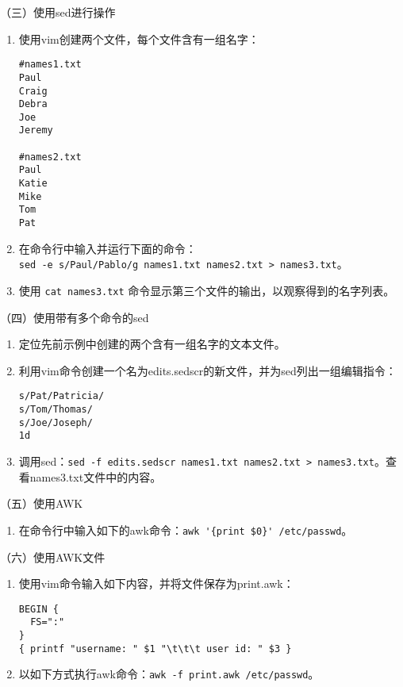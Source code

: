 \vspace{0.1in}
（三）使用sed进行操作
\begin{enumerate}
  \item 使用vim创建两个文件，每个文件含有一组名字：
\begin{verbatim}
#names1.txt
Paul
Craig
Debra
Joe
Jeremy

#names2.txt
Paul
Katie
Mike
Tom
Pat
\end{verbatim}
  \item 在命令行中输入并运行下面的命令：\\ \verb|sed -e s/Paul/Pablo/g names1.txt names2.txt > names3.txt|。
  \item 使用 \verb|cat names3.txt| 命令显示第三个文件的输出，以观察得到的名字列表。
\end{enumerate}

\vspace{0.1in}
（四）使用带有多个命令的sed
\begin{enumerate}
  \item 定位先前示例中创建的两个含有一组名字的文本文件。
  \item 利用vim命令创建一个名为edits.sedscr的新文件，并为sed列出一组编辑指令：
\begin{verbatim}
s/Pat/Patricia/
s/Tom/Thomas/
s/Joe/Joseph/
1d
\end{verbatim}
  \item 调用sed：\verb|sed -f edits.sedscr names1.txt names2.txt > names3.txt|。查看names3.txt文件中的内容。
\end{enumerate}

\vspace{0.1in}
（五）使用AWK
\begin{enumerate}
  \item 在命令行中输入如下的awk命令：\verb|awk '{print $0}' /etc/passwd|。
\end{enumerate}

\vspace{0.1in}
（六）使用AWK文件
\begin{enumerate}
  \item 使用vim命令输入如下内容，并将文件保存为print.awk：
\begin{verbatim}
BEGIN {
  FS=":"
}
{ printf "username: " $1 "\t\t\t user id: " $3 }
\end{verbatim}
  \item 以如下方式执行awk命令：\verb|awk -f print.awk /etc/passwd|。
\end{enumerate}

